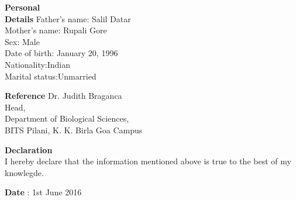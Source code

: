 \documentclass{article}
\begin{document}
         	\begin{flushleft}
       		\vspace{0.4in}
       		{\Large \bf Personal\\ Details} \hspace{0.83in}Father's name: \hspace{0.13in} Salil Datar \\
            \hspace{1.55in}Mother's name: \hspace{0.08in} Rupali Gore\\
            \hspace{1.55in}Sex:\hspace{0.85in} Male\\
            \hspace{1.55in}Date of birth:\hspace{0.255in} January 20, 1996	\\
            \hspace{1.55in}Nationality:\hspace{0.45in}Indian\\
            \hspace{1.55in}Marital status:\hspace{0.28in}Unmarried
               		
            \end{flushleft}
               	
               	
   	\begin{flushleft}
               		\vspace{0.4in}
               		{\Large \bf Reference} \hspace{0.5in} Dr. Judith Braganca\\
               		\hspace{1.5in} Head, \\
               		\hspace{1.55in}Department of Biological Sciences, \\
               		\hspace{1.55in}BITS Pilani, K. K. Birla Goa Campus \\
               	\end{flushleft}
               	
               	\begin{flushleft}
               		\vspace{0.2in}
               		{\Large \bf Declaration}\\
               		\vspace{0.2in}
               		 I hereby declare that the information mentioned above is true to the best of my knowlegde.
               	\end{flushleft}
               	
               	\begin{flushleft}
               		\vspace{0.2in}
               		{\Large \bf Date} : \hspace{0.9in}1st June 2016
               	\end{flushleft}
\end{document}

